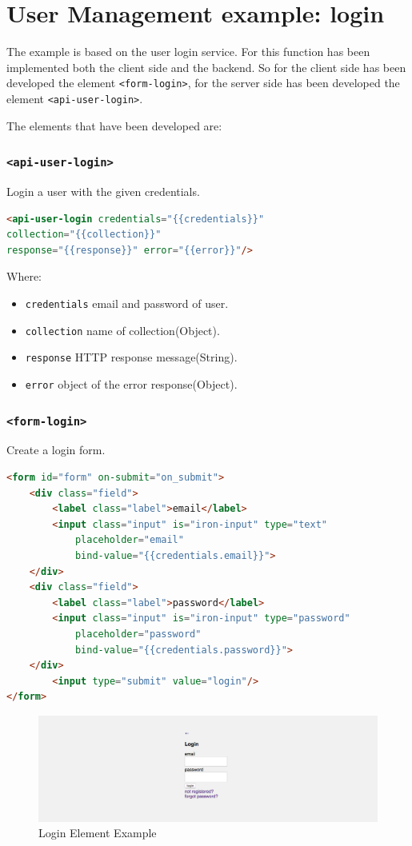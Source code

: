 \section{User Management example: login}
\label{sec:XPR_exmpl}

The example is based on the user login service. 
For this function has been implemented both the client side and the backend. So for the client side has been developed the element \texttt{<form-login>}, for the server side has been developed the element \texttt{<api-user-login>}.

The elements that have been developed are:

\subsubsection{\texttt{<api-user-login>}}

Login a user with the given credentials.

\begin{lstlisting}[language=html]
<api-user-login credentials="{{credentials}}"
collection="{{collection}}" 
response="{{response}}" error="{{error}}"/>
\end{lstlisting}
Where:
\begin{itemize}
\item \texttt{credentials} email and password of user.
\item \texttt{collection} name of collection(Object).
\item \texttt{response}	HTTP response message(String).
\item \texttt{error} object of the error response(Object).
\end{itemize}

\subsubsection{\texttt{<form-login>}}

Create a login form.

\begin{lstlisting}[language=html]
<form id="form" on-submit="on_submit">
    <div class="field">
        <label class="label">email</label>
        <input class="input" is="iron-input" type="text" 
    		placeholder="email" 
            bind-value="{{credentials.email}}">
    </div>
    <div class="field">
        <label class="label">password</label>
        <input class="input" is="iron-input" type="password" 
        	placeholder="password" 
        	bind-value="{{credentials.password}}">
    </div>
      	<input type="submit" value="login"/>
</form>
\end{lstlisting}


\begin {figure}[h]
\graphicspath{{images/chapter_USR/}}
\includegraphics[width=\textwidth]{usr1}
\caption{Login Element Example}
\end {figure}